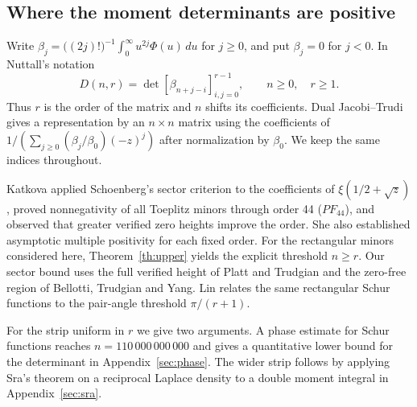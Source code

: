 \documentclass[11pt,a4paper,reqno]{amsart}
\numberwithin{equation}{section}
\begin{document}
\subsection{Where the moment determinants are positive}\label{sec:dtable}

Write \(\beta_j=\big((2j)!\big)^{-1}\int_0^\infty u^{2j}\Phi(u)\,du\) for \(j\ge0\), and put \(\beta_j=0\) for \(j<0\). In Nuttall's notation
\[ D(n,r)=\det[\beta_{n+j-i}]_{i,j=0}^{r-1},\qquad n\ge0,\quad r\ge1. \]
Thus \(r\) is the order of the matrix and \(n\) shifts its coefficients. Dual Jacobi--Trudi gives a representation by an \(n\times n\) matrix using the coefficients of \(1/(\sum_{j\ge0}(\beta_j/\beta_0)(-z)^j)\) after normalization by \(\beta_0\). We keep the same indices throughout.

Katkova \cite[Theorems~1 and~2]{katkova} applied Schoenberg's sector criterion to the coefficients of \(\xi(1/2+\sqrt z)\), proved nonnegativity of all Toeplitz minors through order 44 (\(PF_{44}\)), and observed that greater verified zero heights improve the order. She also established asymptotic multiple positivity for each fixed order. For the rectangular minors considered here, Theorem~\ref{th:upper} yields the explicit threshold \(n\ge r\). Our sector bound uses the full verified height of Platt and Trudgian and the zero-free region of Bellotti, Trudgian and Yang. Lin \cite{lin} relates the same rectangular Schur functions to the pair-angle threshold \(\pi/(r+1)\).

For the strip uniform in \(r\) we give two arguments. A phase estimate for Schur functions reaches \(n=110\,000\,000\,000\) and gives a quantitative lower bound for the determinant in Appendix~\ref{sec:phase}. The wider strip follows by applying Sra's theorem on a reciprocal Laplace density \cite[Theorem~1.2]{sra} to a double moment integral in Appendix~\ref{sec:sra}.
\end{document}
